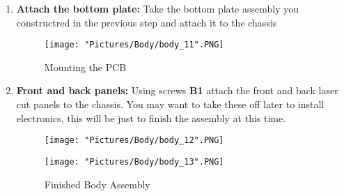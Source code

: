 \documentclass[12pt]{article}
\begin{document}
\begin{enumerate}
\item \textbf{Attach the bottom plate:} Take the bottom plate assembly you constructred in the previous step and attach it to the chassis

\begin{figure}[H]
	\centering
	\texttt{[image: "Pictures/Body/body\_11".PNG]}
	\caption{Mounting the PCB}
\end{figure}

\item \textbf{Front and back panels:} Using screws \textbf{B1} attach the front and back laser cut panels to the chassis. You may want to take these off later to install electronics, this will be just to finish the assembly at this time.

\begin{figure}[H]
  \centering
  \begin{minipage}[b]{0.45\textwidth}
    \texttt{[image: "Pictures/Body/body\_12".PNG]}
  \end{minipage}
  \hfill
  \begin{minipage}[b]{0.45\textwidth}
    \texttt{[image: "Pictures/Body/body\_13".PNG]}
  \end{minipage}
  \caption{Finished Body Assembly}
  \label{finished body}
\end{figure}

\end{enumerate}
\end{document}
